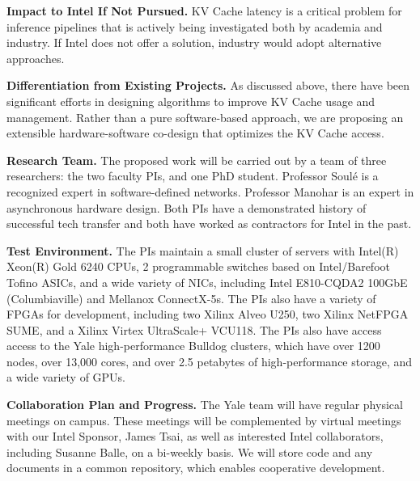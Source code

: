 \documentclass[11pt]{article}
\def\PAR#1{\par\medskip\noindent\textbf{#1}}
\begin{document}
\PAR{Impact to Intel If Not Pursued.}
%
KV Cache latency is a critical problem for inference
pipelines that is actively
being investigated both by academia and industry.
If Intel does not offer a solution, industry would
adopt alternative approaches.

\PAR{Differentiation from Existing Projects.}
%
As discussed above, there have been significant efforts
in designing algorithms to improve KV Cache usage and
management. Rather than a pure software-based approach,
we are proposing an extensible hardware-software co-design that
optimizes the KV Cache access.


\PAR{Research Team.}
%
The proposed work will be carried out by a team of three researchers:
the two faculty PIs, and one PhD student. Professor Soul\'{e} is a
recognized expert in software-defined networks.  Professor Manohar is
an expert in asynchronous hardware design. Both PIs have a
demonstrated history of successful tech transfer and both have worked
as contractors for Intel in the past.




\PAR{Test Environment.}
The PIs maintain a small cluster of servers with Intel(R) Xeon(R) Gold
6240 CPUs, 2 programmable switches based on Intel/Barefoot Tofino
ASICs, and a wide variety of NICs, including Intel E810-CQDA2 100GbE
(Columbiaville) and Mellanox ConnectX-5s. The PIs also have a variety
of FPGAs for development, including two Xilinx Alveo U250, two Xilinx
NetFPGA SUME, and a Xilinx Virtex UltraScale+ VCU118.  The PIs also
have access access to the Yale high-performance Bulldog clusters,
which have over 1200 nodes, over 13,000 cores, and over 2.5 petabytes
of high-performance storage, and a wide variety of GPUs.


\PAR{Collaboration Plan and Progress.}
The Yale team will have regular physical meetings on campus.  These
meetings will be complemented by virtual meetings with our Intel
Sponsor, James Tsai, as well as interested Intel collaborators,
including Susanne Balle, on a bi-weekly basis. We will store code and
any documents in a common repository, which enables cooperative
development.




{\tiny

\balance

}
\end{document}
